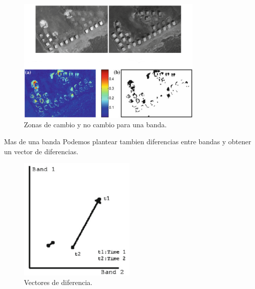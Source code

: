 \documentclass[handout,draft]{beamer}
\begin{document}
\begin{frame}{\subsecname}
  \begin{figure}
  \includegraphics[width=0.8\textwidth]{imagenes/change.png}
  \caption{Zonas de cambio y no cambio para una banda.}
  \end{figure}
\end{frame}

\begin{frame}{\subsecname}
  \begin{block}{Mas de una banda}
    Podemos plantear tambien diferencias entre bandas y obtener un vector de diferencias.
  \end{block}
\end{frame}

\begin{frame}{\subsecname}
  \begin{figure}
  \includegraphics[width=0.5\textwidth]{imagenes/dvector.png}
  \caption{Vectores de diferencia.}
  \end{figure}
\end{frame}
\end{document}
